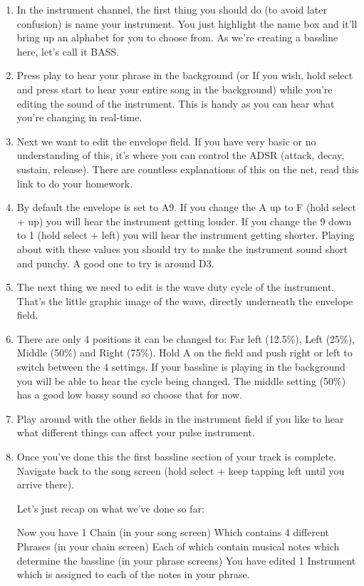 \documentclass[]{article}
\begin{document}
\begin{enumerate}[resume]
\item In the instrument channel, the first thing you should do (to avoid later confusion) is name your instrument. You just highlight the name box and it'll bring up an alphabet for you to choose from. As we're creating a bassline here, let's call it BASS.

\item Press play to hear your phrase in the background (or If you wish, hold select and press start to hear your entire song in the background) while you're editing the sound of the instrument. This is handy as you can hear what you're changing in real-time.

\item Next we want to edit the envelope field. If you have very basic or no understanding of this, it's where you can control the ADSR (attack, decay, sustain, release). There are countless explanations of this on the net, read this link to do your homework.

\item By default the envelope is set to A9. If you change the A up to F (hold select + up) you will hear the instrument getting louder. If you change the 9 down to 1 (hold select + left) you will hear the instrument getting shorter. Playing about with these values you should try to make the instrument sound short and punchy. A good one to try is around D3.

\item The next thing we need to edit is the wave duty cycle of the instrument. That's the little graphic image of the wave, directly underneath the envelope field.

\item There are only 4 positions it can be changed to: Far left (12.5\%), Left (25\%), Middle (50\%) and Right (75\%). Hold A on the field and push right or left to switch between the 4 settings. If your bassline is playing in the background you will be able to hear the cycle being changed. The middle setting (50\%) has a good low bassy sound so choose that for now.

\item Play around with the other fields in the instrument field if you like to hear what different things can affect your pulse instrument.

\item Once you've done this the first bassline section of your track is complete. Navigate back to the song screen (hold select + keep tapping left until you arrive there).

Let's just recap on what we've done so far:

Now you have 1 Chain (in your song screen) Which contains 4 different Phrases (in your chain screen) Each of which contain musical notes which determine the bassline (in your phrase screens) You have edited 1 Instrument which is assigned to each of the notes in your phrase.


\end{enumerate}
\end{document}
